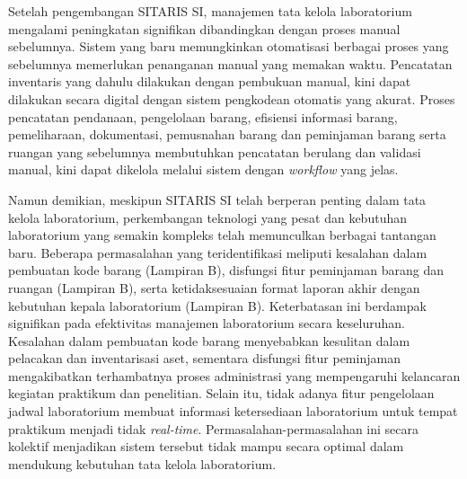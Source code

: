 Setelah pengembangan SITARIS SI, manajemen tata kelola laboratorium mengalami peningkatan signifikan dibandingkan dengan proses manual sebelumnya. Sistem yang baru memungkinkan otomatisasi berbagai proses yang sebelumnya memerlukan penanganan manual yang memakan waktu. Pencatatan inventaris yang dahulu dilakukan dengan pembukuan manual, kini dapat dilakukan secara digital dengan sistem pengkodean otomatis yang akurat. Proses pencatatan pendanaan, pengelolaan barang, efisiensi informasi barang, pemeliharaan, dokumentasi, pemusnahan barang dan peminjaman barang serta ruangan yang sebelumnya membutuhkan pencatatan berulang dan validasi manual, kini dapat dikelola melalui sistem dengan \textit{workflow} yang jelas.

Namun demikian, meskipun SITARIS SI telah berperan penting dalam tata kelola laboratorium, perkembangan teknologi yang pesat dan kebutuhan laboratorium yang semakin kompleks telah memunculkan berbagai tantangan baru. Beberapa permasalahan yang teridentifikasi meliputi kesalahan dalam pembuatan kode barang (Lampiran B), disfungsi fitur peminjaman barang dan ruangan (Lampiran B), serta ketidaksesuaian format laporan akhir dengan kebutuhan kepala laboratorium (Lampiran B). Keterbatasan ini berdampak signifikan pada efektivitas manajemen laboratorium secara keseluruhan. Kesalahan dalam pembuatan kode barang menyebabkan kesulitan dalam pelacakan dan inventarisasi aset, sementara disfungsi fitur peminjaman mengakibatkan terhambatnya proses administrasi yang mempengaruhi kelancaran kegiatan praktikum dan penelitian. Selain itu, tidak adanya fitur pengelolaan jadwal laboratorium membuat informasi ketersediaan laboratorium untuk tempat praktikum menjadi tidak \textit{real-time}. Permasalahan-permasalahan ini secara kolektif menjadikan sistem tersebut tidak mampu secara optimal dalam mendukung kebutuhan tata kelola laboratorium.

